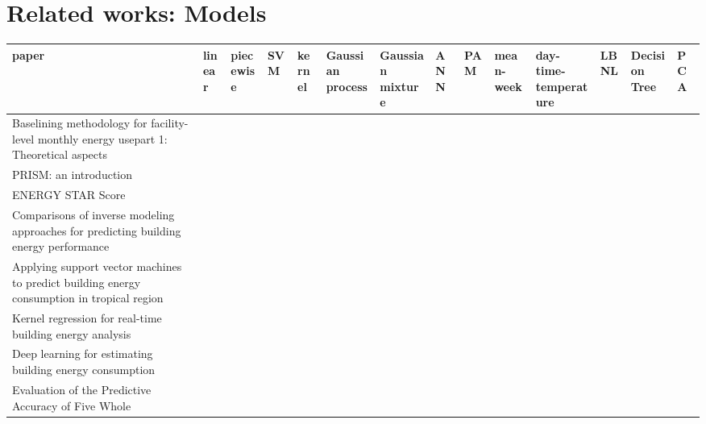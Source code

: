 \documentclass[12pt]{article}
\newcommand{\cmark}{\ding{51}}%
\begin{document}

%
%
\section{Related works: Models}
\begin{table}[h!]
  \centering
    \tiny
  \begin{tabular}{p{3.0cm}|p{0.7cm}|p{0.7cm}|p{0.7cm}|p{0.7cm}|p{0.7cm}|p{0.7cm}|p{0.7cm}|p{0.7cm}|p{0.7cm}|p{0.7cm}|p{0.7cm}|p{0.7cm}|p{0.7cm}}
    \hline
    paper&linear &piecewise &SVM&kernel&Gaussian process&Gaussian mixture&ANN&PAM&mean-week&day-time-temperature&LBNL&Decision Tree&PCA\\
    \hline
    \hline
    Baselining methodology for facility-level monthly energy
    usepart 1: Theoretical aspects~\cite{reddy1997baselining}&\cmark&\cmark&  & &&&&&&&&&\\
    \hline
    PRISM: an introduction~\cite{fels1986prism}&\cmark&&&&&&&&&&&&\\
    \hline
    ENERGY STAR Score~\cite{energyStarDoc}&\cmark&&&&&&&&&&&&\\
    Comparisons of inverse modeling approaches for predicting
    building energy performance~\cite{Zhang2015177}&  &\cmark&  & &\cmark&\cmark&\cmark&&&&&&\\
    \hline
    Applying support vector machines to predict building
    energy consumption in tropical region~\cite{dong2005applying}&&&\cmark&&&&&&&&&&\\
    \hline
    Kernel regression for real-time building energy
    analysis~\cite{brown2012kernel}&&&&\cmark&&&&&&&&&\\
    \hline
    Deep learning for estimating building energy
    consumption~\cite{mocanu2016deep}&&&&&&&\cmark&&&&&&\\
    \hline
    Evaluation of the Predictive Accuracy of Five Whole

\end{tabular}
\end{table}
\end{document}
